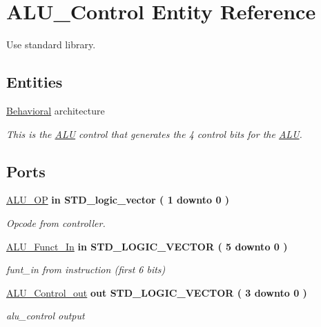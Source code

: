 \hypertarget{class_a_l_u___control}{\section{\-A\-L\-U\-\_\-\-Control \-Entity \-Reference}
\label{class_a_l_u___control}
}


\-Use standard library.  


\subsection*{\-Entities}
\begin{DoxyCompactItemize}
\item 
\hyperlink{class_a_l_u___control_1_1_behavioral}{\-Behavioral} architecture
\begin{DoxyCompactList}\small\item\em \-This is the \hyperlink{class_a_l_u}{\-A\-L\-U} control that generates the 4 control bits for the \hyperlink{class_a_l_u}{\-A\-L\-U}. \end{DoxyCompactList}\end{DoxyCompactItemize}
\*
\*
\subsection*{\-Ports}
 \begin{DoxyCompactItemize}
\item 
\hyperlink{class_a_l_u___control_ab5e38318e201e0011dc9fe806b2c9ea4}{\-A\-L\-U\-\_\-\-O\-P}  {\bfseries {\bfseries in }} {\bfseries \-S\-T\-D\-\_\-logic\-\_\-vector (   1    downto    0  ) } 
\begin{DoxyCompactList}\small\item\em \-Opcode from controller. \end{DoxyCompactList}\item 
\hyperlink{class_a_l_u___control_aa057cc5bea77eab736c8c526429fa204}{\-A\-L\-U\-\_\-\-Funct\-\_\-\-In}  {\bfseries {\bfseries in }} {\bfseries \-S\-T\-D\-\_\-\-L\-O\-G\-I\-C\-\_\-\-V\-E\-C\-T\-O\-R (   5    downto    0  ) } 
\begin{DoxyCompactList}\small\item\em funt\-\_\-in from instruction (first 6 bits) \end{DoxyCompactList}\item 
\hyperlink{class_a_l_u___control_a770899168989eb2b8a2d815fbd0a3a17}{\-A\-L\-U\-\_\-\-Control\-\_\-out}  {\bfseries {\bfseries out }} {\bfseries \-S\-T\-D\-\_\-\-L\-O\-G\-I\-C\-\_\-\-V\-E\-C\-T\-O\-R (   3    downto    0  ) } 
\begin{DoxyCompactList}\small\item\em alu\-\_\-control output \end{DoxyCompactList}\end{DoxyCompactItemize}


